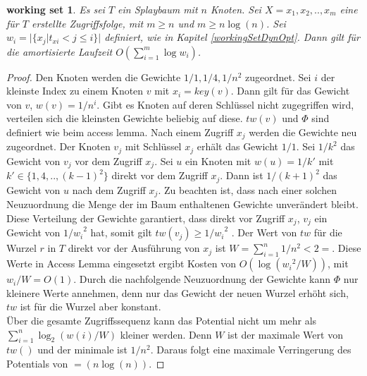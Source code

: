 \documentclass[a4paper,12pt]{article}
\begin{document}
 
 
 \newtheorem{Satz2}{working set}[section] \label{workingSetSplay}
 \begin{Satz2} Es sei $T$ ein Splaybaum mit $n$ Knoten. Sei $X = x_1,x_2,..,x_m$ eine für $T$ erstellte Zugriffsfolge, mit $m \geq n$ und $m \geq n \log\left(n\right) $. Sei \\ ${w_i = \vert\{x_j \vert t_{xi} < j \leq i   \} \vert }$ definiert, wie in Kapitel \ref{workingSetDynOpt}. Dann gilt für die amortisierte Laufzeit $O\left(\sum_{i = 1}^{m} \log w_i \right)$.
 \end{Satz2}
 \begin{proof}
 Den Knoten werden die Gewichte $1/1, 1/4, 1/n^2$ zugeordnet. Sei $i$ der kleinste Index zu einem Knoten $v$ mit $x_i = \mathit{key\left(v\right)}$. Dann gilt für das Gewicht von $v$, $w\left(v\right) = 1 /n^i$. Gibt es Knoten auf deren Schlüssel nicht zugegriffen wird, verteilen sich die kleinsten Gewichte beliebig auf diese. $\mathit{tw}\left(v\right)$ und $\Phi$ sind definiert wie beim access lemma. Nach einem Zugriff $x_j$ werden die Gewichte neu zugeordnet. Der Knoten $v_j$ mit Schlüssel $x_j$ erhält das Gewicht $1/1$. Sei $1/k^2$ das Gewicht von $v_j$ vor dem Zugriff $x_j$. Sei $u$ ein Knoten mit $w\left(u\right) = 1 / k'$ mit  $k' \in \{1, 4,.., \left(k-1\right)^2\}$ direkt vor dem Zugriff $x_j$. Dann ist $1 /\left(k + 1\right)^2$ das Gewicht von $u$ nach dem Zugriff $x_j$. Zu beachten ist, dass nach einer solchen Neuzuordnung die Menge der im Baum enthaltenen Gewichte unverändert bleibt. \\
 Diese Verteilung der Gewichte garantiert, dass direkt vor Zugriff $x_j$, $v_j$ ein Gewicht von ${1 /w_i}^2$ hat, somit gilt $\mathit{tw}\left(v_j\right) \geq {1 /w_i}^2$ . Der Wert von $\mathit{tw}$ für die Wurzel $r$ in $T$ direkt vor der Ausführung von $x_j$ ist $W = \sum_{i = 1}^{n} 1/ n^2 < 2 = $. Diese Werte in Access Lemma eingesetzt ergibt Kosten von $O\left(\log\left({w_i}^2 /W  \right)\right)$, mit $w_i /W = O\left(1\right)$. Durch die nachfolgende Neuzuordnung der Gewichte kann $\Phi$ nur kleinere Werte annehmen, denn nur das Gewicht der neuen Wurzel erhöht sich, $\mathit{tw}$ ist für die Wurzel aber konstant.\\
 Über die gesamte Zugriffssequenz kann das Potential nicht um mehr als $\sum_{i = 1}^{n} \log_2\left(w\left(i\right) / W\right)$ kleiner werden. Denn $W$ ist der maximale Wert von $\mathit{tw}\left(\right)$ und  der minimale ist $1 /n^2$. Daraus folgt eine maximale Verringerung des Potentials von $=\left(n \log \left(n\right)\right)$. 
 \end{proof}
 


 











\newpage


\end{document}
